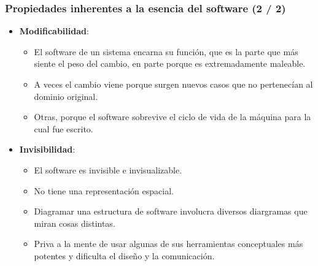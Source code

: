 \documentclass{beamer}
\begin{document}
\begin{frame}
\frametitle{Propiedades inherentes a la esencia del software (2 / 2)}
\begin{itemize}
	\item \textbf{Modificabilidad}:
			\begin{itemize}
				\item El software de un sistema encarna su función, que es la parte que más siente el peso del cambio, en parte porque es extremadamente maleable.
				\item A veces el cambio viene porque surgen nuevos casos que no pertenecían al dominio original.
				\item Otras, porque el software sobrevive el ciclo de vida de la máquina para la cual fue escrito.			
			\end{itemize}
	\item \textbf{Invisibilidad}:
			\begin{itemize}
				\item El software es invisible e invisualizable.
				\item No tiene una representación espacial.
				\item Diagramar una estructura de software involucra diversos diargramas que miran cosas distintas.
				\item Priva a la mente de usar algunas de sus herramientas conceptuales más potentes y dificulta el diseño y la comunicación. 			
			\end{itemize}
	  
\end{itemize}

\end{frame}
\end{document}
